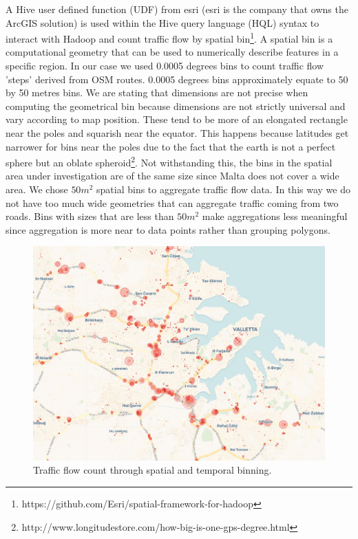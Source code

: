 \documentclass[12pt, a4paper]{report}
\theoremstyle{definition}
\theoremstyle{definition}%
\theoremstyle{definition}%
\theoremstyle{definition}%
\theoremstyle{definition}%
\theoremstyle{definition}%
\begin{document}
A Hive user defined function (UDF) from esri (esri is the company that owns the ArcGIS solution) is used within the Hive query language (HQL) syntax to interact with Hadoop and count traffic flow by spatial bin\footnote{https://github.com/Esri/spatial-framework-for-hadoop}. A spatial bin is a computational geometry that can be used to numerically describe features in a specific region. In our case we used 0.0005 degrees bins to count traffic flow 'steps' derived from OSM routes. 0.0005 degrees bins approximately equate to 50 by 50 metres bins. We are stating that dimensions are not precise when computing the geometrical bin because dimensions are not strictly universal and vary according to map position. These tend to be more of an elongated rectangle near the poles and squarish near the equator. This happens because latitudes get narrower for bins near the poles due to the fact that the earth is not a perfect sphere but an oblate spheroid\footnote{http://www.longitudestore.com/how-big-is-one-gps-degree.html}. Not withstanding this, the bins in the spatial area under investigation are of the same size since Malta does not cover a wide area. We chose $50m^2$ spatial bins to aggregate traffic flow data. In this way we do not have too much wide geometries that can aggregate traffic coming from two roads. Bins with sizes that are less than $50m^2$ make aggregations less meaningful since aggregation is more near to data points rather than grouping polygons. 

\begin{figure}[!]	
	\includegraphics[scale=0.6]{concentric_map.jpg}
	\centering
	\caption{Traffic flow count through spatial and temporal binning. }
	\label{fig:spatial_binning_traffic_count}
\end{figure}
\end{document}
